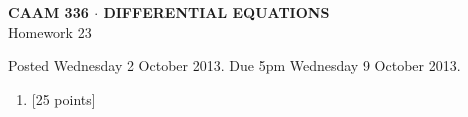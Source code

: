 \documentclass[10pt]{article}
\begin{document}
\vspace*{-5em}
\begin{center}
\large \textsf{\textbf{CAAM 336 $\cdot$ DIFFERENTIAL EQUATIONS}\\[0.5em]
Homework 23 }
\end{center}

Posted Wednesday 2 October 2013.  Due 5pm Wednesday 9 October 2013.

\begin{enumerate}\addtocounter{enumi}{22}
\item {[25 points]}  
\end{enumerate}
\end{document}

